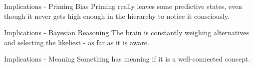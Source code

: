 \begin{frame}[c]{Implications - Priming Bias}
    \Large
    \pause
    Priming really leaves some predictive states, even though it never gets
    high enough in the hierarchy to notice it consciously.
\end{frame}


\begin{frame}[c]{Implications - Bayesian Reasoning}
    \Large
    The brain is constantly weighing alternatives and selecting the likeliest - as far as it is aware.
\end{frame}



\begin{frame}[c]{Implications - Meaning}
    \Large
    Something has meaning if it is a well-connected concept.
\end{frame}







